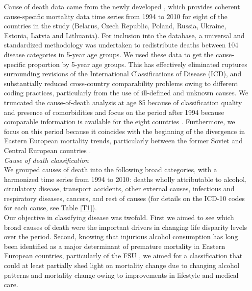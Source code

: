 \documentclass{article}
\begin{document}
\begin{spacing}{1.5}
Cause of death data came from the newly developed \citet{HcO}, which provides coherent cause-specific mortality data time series from 1994 to 2010 for eight of the countries in the study (Belarus, Czech Republic, Poland, Russia, Ukraine, Estonia, Latvia and Lithuania). For inclusion into the database, a universal and standardized methodology was undertaken to redistribute deaths between 104 disease categories in 5-year age groups. We used these data to get the cause-specific proportion by 5-year age groups. This has effectively eliminated ruptures surrounding revisions of the International Classifications of Disease (ICD), and substantially reduced cross-country comparability problems owing to different coding practices, particularly from the use of ill-defined and unknown causes. We truncated the cause-of-death analysis at age 85 because of classification quality and presence of comorbidities and focus on the period after 1994 because comparable information is available for the eight countries \citep{HcO}. Furthermore, we focus on this period because it coincides with the beginning of the divergence in Eastern European mortality trends, particularly between the former Soviet and Central European countries \citep{mesle2004mortality}.\\

\emph{Cause of death classification}\\

We grouped causes of death into the following broad categories, with a harmonized time series from 1994 to 2010:  deaths wholly attributable to alcohol, circulatory disease, transport accidents, other external causes, infectious and respiratory diseases, cancers, and rest of causes (for details on the ICD-10 codes for each cause, see Table \ref{T1}). \\

Our objective in classifying disease was twofold. First we aimed to see which broad causes of death were the important drivers in changing life disparity levels over the period. Second, knowing that injurious alcohol consumption has long been identified as a major determinant of premature mortality in Eastern European countries, particularly of the FSU \citep{leon1997huge,mckee2005composition,	mckee2001,rehm2007,zaridze2009alcohol,
zaridze2014alcohol,grigoriev2015}, we aimed for a classification that could at least partially shed light on mortality change due to changing alcohol patterns and mortality change owing to improvements in lifestyle and medical care. \\


\end{spacing}
\end{document}
